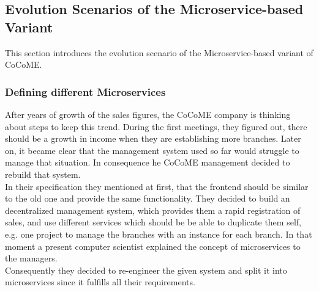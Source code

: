 \newpage

\subsection{Evolution Scenarios of the Microservice-based Variant}
This section introduces the evolution scenario of the Microservice-based variant of
CoCoME.
\subsubsection{Defining different Microservices}
After years of growth of the sales figures, the CoCoME company is thinking about steps to keep this trend. During the first meetings, they figured out, there should be a growth in income when they are establishing more branches. Later on, it became clear that the management system used so far would struggle to manage that situation. In consequence he CoCoME management decided to rebuild that system.\\
In their specification they mentioned at first, that the frontend should be similar to the old one and provide the same functionality. They decided to build an decentralized management system, which provides them a rapid registration of sales, and use different services which should be be able to duplicate them self, e.g. one project to manage the branches with an instance for each branch. In that moment a present computer scientist explained the concept of microservices to the managers.\\
Consequently they decided to re-engineer the given system and split it into microservices since it fulfills all their requirements. 

	
	

